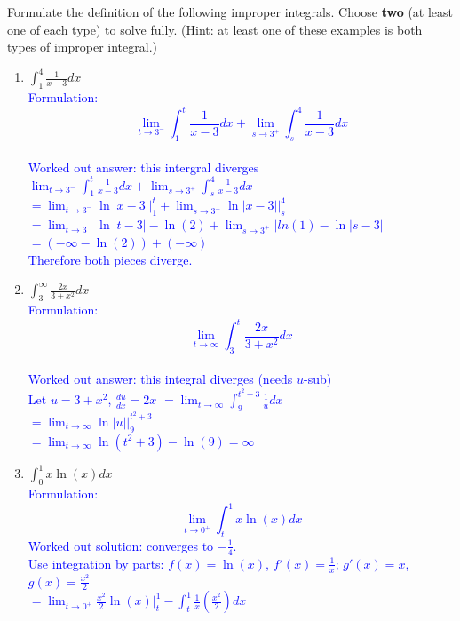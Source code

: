 \documentclass{ximera}
\begin{document}
\begin{exercise}
    Formulate the definition of the following improper integrals.  Choose \textbf{two} (at least one of each type) to solve fully. (Hint: at least one of these examples is both types of improper integral.)
    \begin{enumerate}
        \item $\int_1^4 \frac{1}{x-3}dx$\\
        \textcolor{blue}{Formulation: 
        $$\lim_{t\rightarrow 3^-}\int_1^t \frac{1}{x-3}dx + \lim_{s\rightarrow 3^+} \int_s^4\frac{1}{x-3}dx$$\\
        Worked out answer: this intergral diverges\\
        $\lim_{t\rightarrow 3^-}\int_1^t \frac{1}{x-3}dx + \lim_{s\rightarrow 3^+} \int_s^4\frac{1}{x-3}dx$\\
        $=\lim_{t\rightarrow 3^-}\ln|x-3|\bigg|_1^t + \lim_{s\rightarrow 3^+} \ln|x-3|\bigg|_s^4$\\
        $=\lim_{t\rightarrow 3^-} \ln|t-3|-\ln(2)+\lim_{s\rightarrow 3^+}|ln(1)-\ln|s-3|$\\
        $=(-\infty-\ln(2))+(-\infty)$\\
        Therefore both pieces diverge.}
        \item $\int_3^\infty \frac{2x}{3+x^2}dx$\\
        \textcolor{blue}{Formulation:
        $$\lim_{t\rightarrow \infty}\int_3^t\frac{2x}{3+x^2}dx$$\\
        Worked out answer: this integral diverges (needs $u$-sub)\\
        Let $u=3+x^2$, $\frac{du}{dx}=2x$
        $=\lim_{t\rightarrow \infty}\int_9^{t^2+3}\frac{1}{u}dx$\\
        $=\lim_{t\rightarrow \infty} \ln|u|\bigg|_9^{t^2+3}$\\
        $=\lim_{t\rightarrow \infty} \ln(t^2+3)-\ln(9)=\infty$}
        \item $\int_0^1 x\ln(x)dx$\\
        \textcolor{blue}{Formulation:\\
        $$\lim_{t\rightarrow 0^+}\int_t^1 x\ln(x)dx$$
        Worked out solution: converges to $-\frac14$.\\
        Use integration by parts: $f(x)=\ln(x)$, $f'(x)=\frac1x$; $g'(x)=x$, $g(x)=\frac{x^2}{2}$\\
        $=\lim_{t\rightarrow 0^+} \frac{x^2}{2}\ln(x)\bigg|_t^1 -\int_t^1 \frac{1}{x}\left(\frac{x^2}{2}\right)dx$\\
}
\end{enumerate}
\end{exercise}
\end{document}
